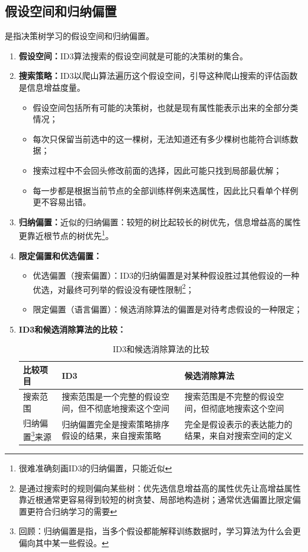 \documentclass[../main.tex]{subfiles}
\begin{document}
\subsection{假设空间和归纳偏置}\label{sec:dt-inductive-bias}
是指决策树学习的假设空间和归纳偏置。
\begin{enumerate}
    \item \textbf{假设空间：}ID3算法搜索的假设空间就是可能的决策树的集合。
    \item \textbf{搜索策略：}ID3以爬山算法遍历这个假设空间，引导这种爬山搜索的评估函数是信息增益度量。
    {\small\kaishu
    \begin{itemize}
        \item 假设空间包括所有可能的决策树，也就是现有属性能表示出来的全部分类情况；
        \item 每次只保留当前选中的这一棵树，无法知道还有多少棵树也能符合训练数据；
        \item 搜索过程中不会回头修改前面的选择，因此可能只找到局部最优解；
        \item 每一步都是根据当前节点的全部训练样例来选属性，因此比只看单个样例更不容易出错。
    \end{itemize}
    }
    \item \textbf{归纳偏置：}近似的归纳偏置：较短的树比起较长的树优先，信息增益高的属性更靠近根节点的树优先\footnote{很难准确刻画ID3的归纳偏置，只能近似}。

    \item \textbf{限定偏置和优选偏置：}
    \begin{itemize}
        \item 优选偏置（搜索偏置）：ID3的归纳偏置是对某种假设胜过其他假设的一种优选，对最终可列举的假设没有硬性限制\footnote{是通过搜索时的规则偏向某些树：优先选信息增益高的属性优先让高增益属性靠近根通常更容易得到较短的树贪婪、局部地构造树；通常优选偏置比限定偏置更符合归纳学习的需要}；
        \item 限定偏置（语言偏置）：候选消除算法的偏置是对待考虑假设的一种限定；
    \end{itemize}

    \item \textbf{ID3和候选消除算法的比较：}
    \begin{table}[H]
        \centering
        \caption{ID3和候选消除算法的比较}
        \begin{tabular}{p{3.2cm}p{5.6cm}p{5.6cm}}
            \toprule
            比较项目 & ID3 & 候选消除算法 \\
            \midrule
            搜索范围 & 搜索范围是一个完整的假设空间，但不彻底地搜索这个空间 & 搜索范围是不完整的假设空间，但彻底地搜索这个空间 \\
            \midrule
            归纳偏置\footnote{回顾：归纳偏置是指，当多个假设都能解释训练数据时，学习算法为什么会更偏向其中某一些假设。}来源 & 归纳偏置完全是搜索策略排序假设的结果，来自搜索策略 & 完全是假设表示的表达能力的结果，来自对搜索空间的定义 \\
            \bottomrule
        \end{tabular}
    \end{table}


\end{enumerate}
\end{document}
